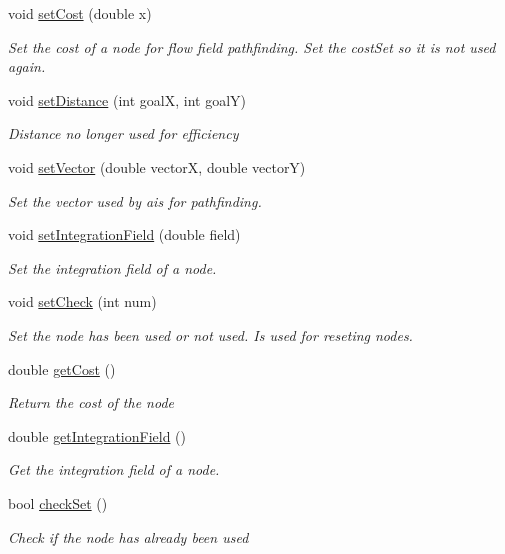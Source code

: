 \begin{DoxyCompactItemize}
void \mbox{\hyperlink{class_node_adefee65f1133ce5f2e0b5a363e250ae6}{set\+Cost}} (double x)
\begin{DoxyCompactList}\small\item\em Set the cost of a node for flow field pathfinding. Set the cost\+Set so it is not used again. \end{DoxyCompactList}\item 
void \mbox{\hyperlink{class_node_a2066fcdaacfab4e47e976a9a4f60f011}{set\+Distance}} (int goalX, int goalY)
\begin{DoxyCompactList}\small\item\em Distance no longer used for efficiency \end{DoxyCompactList}\item 
void \mbox{\hyperlink{class_node_af93f2231cdb17bec0ff4d77972aefc82}{set\+Vector}} (double vectorX, double vectorY)
\begin{DoxyCompactList}\small\item\em Set the vector used by ais for pathfinding. \end{DoxyCompactList}\item 
void \mbox{\hyperlink{class_node_ae93169d2d1e75142b35699b22804ab82}{set\+Integration\+Field}} (double field)
\begin{DoxyCompactList}\small\item\em Set the integration field of a node. \end{DoxyCompactList}\item 
void \mbox{\hyperlink{class_node_a88680b24156b672fc7cb3598e03b065b}{set\+Check}} (int num)
\begin{DoxyCompactList}\small\item\em Set the node has been used or not used. Is used for reseting nodes. \end{DoxyCompactList}\item 
double \mbox{\hyperlink{class_node_a6598ebb34ab252ac0258b32a78f689d0}{get\+Cost}} ()
\begin{DoxyCompactList}\small\item\em Return the cost of the node \end{DoxyCompactList}\item 
double \mbox{\hyperlink{class_node_a1d3e51a36ef8794ca73d3be104ba792c}{get\+Integration\+Field}} ()
\begin{DoxyCompactList}\small\item\em Get the integration field of a node. \end{DoxyCompactList}\item 
bool \mbox{\hyperlink{class_node_a7888accf4c497dbc71e5f55f8c75a5e4}{check\+Set}} ()
\begin{DoxyCompactList}\small\item\em Check if the node has already been used \end{DoxyCompactList}\end{DoxyCompactItemize}
